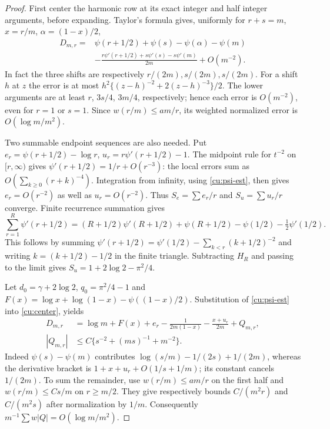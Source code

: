 \begin{proof}
First center the harmonic row at its exact integer and half integer
arguments, before expanding. Taylor's formula gives, uniformly for
$r+s=m$, $x=r/m$, $\alpha=(1-x)/2$,
\begin{equation}\label{cu:center}
 \begin{split}
 D_{m,r}={}&\psi(r+1/2)+\psi(s)-\psi(\alpha)-\psi(m)\\
 &-\frac{r\psi'(r+1/2)+s\psi'(s)-s\psi'(m)}{2m}+O(m^{-2}).
 \end{split}
\end{equation}
In fact the three shifts are respectively $r/(2m),s/(2m),s/(2m)$.
For a shift $h$ at $z$ the error is at most
$h^2\{(z-h)^{-2}+2(z-h)^{-3}\}/2$.
The lower arguments are at least $r$, $3s/4$, $3m/4$, respectively;
hence each error is $O(m^{-2})$, even for $r=1$ or $s=1$.
Since $w(r/m)\leq am/r$, its weighted normalized error is
$O(\log m/m^2)$.

Two summable endpoint sequences are also needed. Put
$e_r=\psi(r+1/2)-\log r$, $u_r=r\psi'(r+1/2)-1$.
The midpoint rule for $t^{-2}$ on $[r,\infty)$ gives
$\psi'(r+1/2)=1/r+O(r^{-3})$: the local errors sum as
$O(\sum_{k\geq0}(r+k)^{-4})$. Integration from infinity, using
\eqref{cu:psi-est}, then gives $e_r=O(r^{-2})$ as well as
$u_r=O(r^{-2})$. Thus $S_e=\sum e_r/r$ and $S_u=\sum u_r/r$ converge.
Finite recurrence summation gives
\[
 \sum_{r=1}^R\psi'(r+1/2)
 =(R+1/2)\psi'(R+1/2)+\psi(R+1/2)
               -\psi(1/2)-\tfrac12\psi'(1/2).
\]
This follows by summing
$\psi'(r+1/2)=\psi'(1/2)-\sum_{k<r}(k+1/2)^{-2}$ and writing
$k=(k+1/2)-1/2$ in the finite triangle. Subtracting $H_R$ and passing
to the limit gives $S_u=1+2\log2-\pi^2/4$.

Let $d_0=\gamma+2\log2$, $q_0=\pi^2/4-1$ and
$F(x)=\log x+\log(1-x)-\psi((1-x)/2)$. Substitution of
\eqref{cu:psi-est} into \eqref{cu:center}, yields
\begin{equation}\label{cu:row-expand}
 \begin{aligned}
 D_{m,r}&=\log m+F(x)+e_r-\frac1{2m(1-x)}
                 -\frac{x+u_r}{2m}+Q_{m,r},\\
 |Q_{m,r}|&\leq C\{s^{-2}+(ms)^{-1}+m^{-2}\}.
 \end{aligned}
\end{equation}
Indeed $\psi(s)-\psi(m)$ contributes
$\log(s/m)-1/(2s)+1/(2m)$, whereas the derivative bracket is
$1+x+u_r+O(1/s+1/m)$; its constant cancels $1/(2m)$.
To sum the remainder, use $w(r/m)\leq am/r$ on the first half and
$w(r/m)\leq Cs/m$ on $r\geq m/2$. They give respectively bounds
$C/(m^2r)$ and $C/(m^2s)$ after normalization by $1/m$.
Consequently $m^{-1}\sum w|Q|=O(\log m/m^2)$.


\end{proof}
